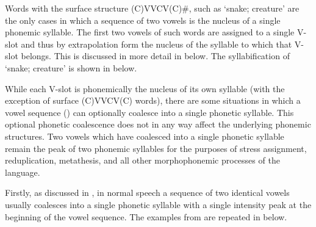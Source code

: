 Words with the surface structure (C)VVCV(C){\#}, such as  `snake; creature'
are the only cases in which a sequence of two vowels is the nucleus of a single phonemic syllable.
The first two vowels of such words are assigned to a single V-slot
and thus by extrapolation form the nucleus
of the syllable to which that V-slot belongs.
This is discussed in more detail in  below.
The syllabification of  `snake; creature' is shown in  below.

\begin{exe}
	\label{as:Syl:kaunaq}
\end{exe}

While each V-slot is phonemically the nucleus of its own syllable
(with the exception of surface (C)VVCV(C) words),
there are some situations in which a vowel sequence ()
can optionally coalesce into a single phonetic syllable.
This optional phonetic coalescence does not in any way affect the underlying phonemic structures.
Two vowels which have coalesced into a single phonetic syllable
remain the peak of two phonemic syllables for the purposes of
stress assignment, reduplication, metathesis,
and all other morphophonemic processes of the language.

Firstly, as discussed in ,
in normal speech a sequence of two identical vowels usually
coalesces into a single phonetic syllable with a single
intensity peak at the beginning of the vowel sequence.
The examples from 
are repeated in  below.

